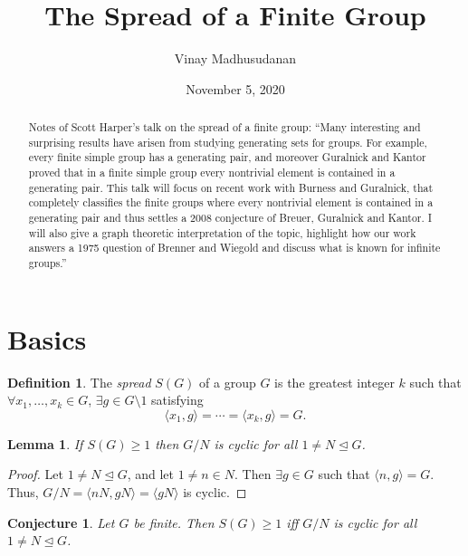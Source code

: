 \documentclass[svgnames]{article}
\newtheorem{Lemma}[Theorem]{Lemma}
\newtheorem{Conjecture}[Theorem]{Conjecture}
\theoremstyle{definition}
\newtheorem{Definition}[Theorem]{Definition}
\theoremstyle{remark}
\begin{document}
\title{\textbf{The Spread of a Finite Group}}
\author{\small Vinay Madhusudanan}
\date{\scriptsize November 5, 2020}
\maketitle

\begin{abstract}
Notes of Scott Harper's talk on the spread of a finite group: ``Many interesting and surprising results have arisen from studying generating sets for groups. For example, every finite simple group has a generating pair, and moreover Guralnick and Kantor proved that in a finite simple group every nontrivial element is contained in a generating pair. This talk will focus on recent work with Burness and Guralnick, that completely classifies the finite groups where every nontrivial element is contained in a generating pair and thus settles a 2008 conjecture of Breuer, Guralnick and Kantor. I will also give a graph theoretic interpretation of the topic, highlight how our work answers a 1975 question of Brenner and Wiegold and discuss what is known for infinite groups.''
\end{abstract}

\begingroup
\let\clearpage\relax
\tableofcontents
\endgroup

\section{Basics}
\begin{Definition}
The \emph{spread} $S(G)$ of a group $G$ is the greatest integer $k$ such that $\forall x_1, \ldots, x_k \in G$, $\exists g \in G \setminus 1$ satisfying
\begin{equation*}
	\langle x_1, g \rangle = \cdots = \langle x_k, g \rangle = G.
\end{equation*}
\end{Definition}

\begin{Lemma}
If $S(G) \ge 1$ then $G/N$ is cyclic for all $1 \ne N \unlhd G$.
\end{Lemma}
\begin{proof}
Let $1 \ne N \unlhd G$, and let $1 \ne n \in N$. Then $\exists g \in G$ such that $\langle n, g \rangle = G$.
Thus, $G/N = \langle nN, gN \rangle = \langle gN \rangle$ is cyclic.
\end{proof}

\begin{Conjecture}
Let $G$ be finite. Then $S(G) \ge 1$ iff $G/N$ is cyclic for all $1 \ne N \unlhd G$.
\end{Conjecture}
\end{document}
